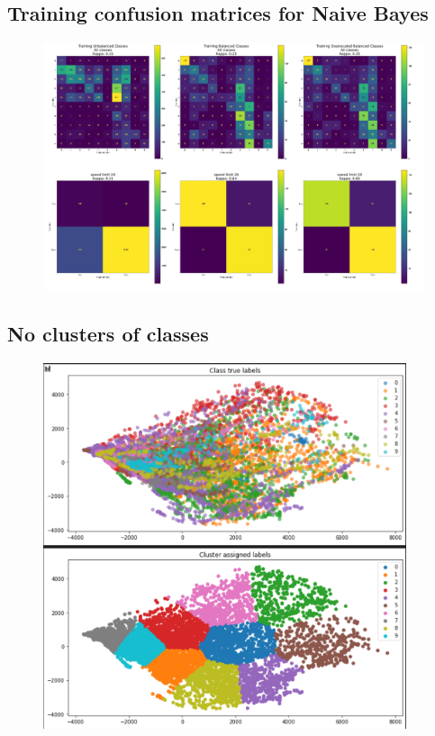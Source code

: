 \documentclass[11pt]{article}
\begin{document}
\begin{appendices}
\subsection{Training confusion matrices for Naive Bayes}\label{NaiveBayesConfMatTraining}
\begin{figure}[h!]
  \centering
  \includegraphics[width=1\textwidth]{Images/NaiveBayesConfMatTraining.PNG}
\end{figure}

\newpage
\subsection{No clusters of classes}\label{app:BadClustering}
\begin{figure}[h!]
    \centering
    \includegraphics[width=0.95\textwidth]{Images/BadClustering.png}
\end{figure}


\end{appendices}
\end{document}
